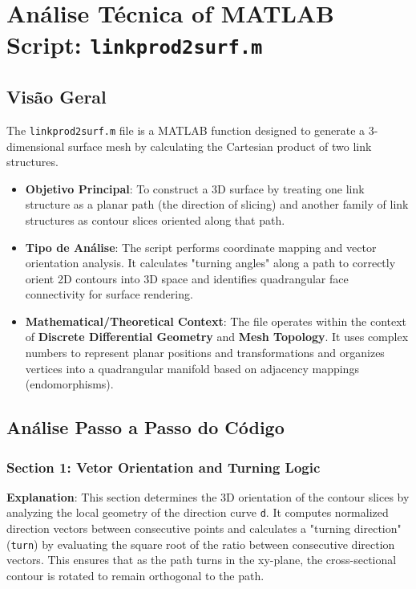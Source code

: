 
\chapter{Análise Técnica of MATLAB Script: \texttt{linkprod2surf.m}}
\section{Visão Geral}

The \texttt{linkprod2surf.m} file is a MATLAB function designed to generate a 3-dimensional surface mesh by calculating the Cartesian product of two link structures.

\begin{itemize}
\item \textbf{Objetivo Principal}: To construct a 3D surface by treating one link structure as a planar path (the direction of slicing) and another family of link structures as contour slices oriented along that path.
\item \textbf{Tipo de Análise}: The script performs coordinate mapping and vector orientation analysis. It calculates "turning angles" along a path to correctly orient 2D contours into 3D space and identifies quadrangular face connectivity for surface rendering.
\item \textbf{Mathematical/Theoretical Context}: The file operates within the context of \textbf{Discrete Differential Geometry} and \textbf{Mesh Topology}. It uses complex numbers to represent planar positions and transformations and organizes vertices into a quadrangular manifold based on adjacency mappings (endomorphisms).
\end{itemize}

\section{Análise Passo a Passo do Código}

\subsection{Section 1: Vetor Orientation and Turning Logic}
\textbf{Explanation}: This section determines the 3D orientation of the contour slices by analyzing the local geometry of the direction curve \texttt{d}. It computes normalized direction vectors between consecutive points and calculates a "turning direction" (\texttt{turn}) by evaluating the square root of the ratio between consecutive direction vectors. This ensures that as the path turns in the xy-plane, the cross-sectional contour is rotated to remain orthogonal to the path.


